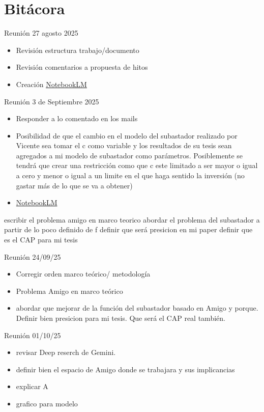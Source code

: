\chapter{Bitácora}\label{bitacora}

Reunión 27 agosto 2025

\begin{itemize}
    \item Revisión estructura trabajo/documento
    \item Revisión comentarios a propuesta de hitos
    \item Creación \href{https://notebooklm.google.com/notebook/c8490f2d-f084-4fe0-968a-d449fc4a9cde?authuser=1}{NotebookLM}
\end{itemize}

Reunión 3 de Septiembre 2025

\begin{itemize}
    \item Responder a lo comentado en los mails
    \item Posibilidad de que el cambio en el modelo del subastador realizado por Vicente sea tomar el c como variable y los resultados de su tesis sean agregados a mi modelo de subastador como parámetros. Posiblemente se tendrá que crear una restricción como que c este limitado a ser mayor o  igual a cero y menor o igual a un limite en el que haga sentido la inversión (no gastar más de lo que se va a obtener)
    \item \href{https://notebooklm.google.com/notebook/c8490f2d-f084-4fe0-968a-d449fc4a9cde?authuser=1}{NotebookLM}
\end{itemize}



escribir el problema amigo en marco teorico
abordar el problema del subastador a partir de lo poco definido de f
definir que será presicion en mi paper
definir que es el CAP para mi tesis

Reunión 24/09/25

\begin{itemize}
    \item Corregir orden marco teórico/ metodología
    \item Problema Amigo en marco teórico
    \item abordar que mejorar de la función del subastador basado en Amigo y porque. Definir bien presicion para mi tesis. Que será el CAP real también.
\end{itemize}

Reunión 01/10/25
\begin{itemize}
\item revisar Deep reserch de Gemini.
\item definir bien el espacio de Amigo donde se trabajara y sus implicancias
\item explicar A
\item grafico para modelo 
\end{itemize}

